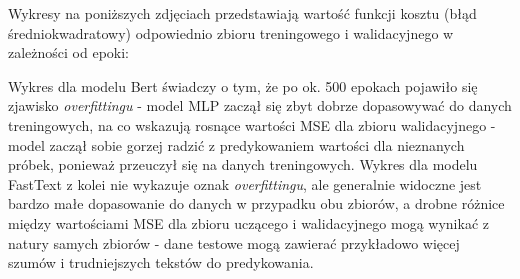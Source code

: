 \documentclass{article}
\begin{document}
    \noindent Wykresy na poniższych zdjęciach przedstawiają wartość funkcji kosztu (błąd średniokwadratowy) odpowiednio zbioru treningowego i walidacyjnego w zależności od epoki:

    \noindent Wykres dla modelu Bert świadczy o tym, że po ok. 500 epokach pojawiło się zjawisko \textit{overfittingu} - model MLP zaczął się zbyt dobrze dopasowywać do danych treningowych, na co wskazują rosnące wartości MSE dla zbioru walidacyjnego - model zaczął sobie gorzej radzić z predykowaniem wartości dla nieznanych próbek, ponieważ przeuczył się na danych treningowych. Wykres dla modelu FastText z kolei nie wykazuje oznak \textit{overfittingu}, ale generalnie widoczne jest bardzo małe dopasowanie do danych w przypadku obu zbiorów, a drobne różnice między wartościami MSE dla zbioru uczącego i walidacyjnego mogą wynikać z natury samych zbiorów - dane testowe mogą zawierać przykładowo więcej szumów i trudniejszych tekstów do predykowania.

\vspace{1cm}
\hrulefill
% 
% 
\end{document}
